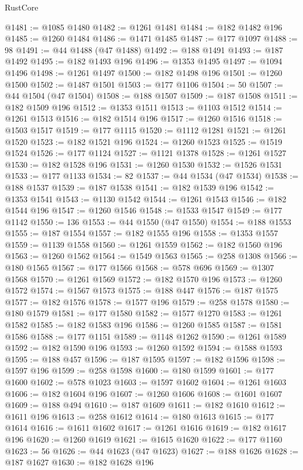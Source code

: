 \begin{lexlean}{RustCore}
\begin{coremodule}
@1481 := @1085 @1480
@1482 := @1261 @1481
@1484 := @182 @1482 @196
@1485 := @1260 @1484
@1486 := @1471 @1485
@1487 := @177 @1097
@1488 := 98
@1491 := @44 @1488 (@47 @1488)
@1492 := @188 @1491
@1493 := @187 @1492
@1495 := @182 @1493 @196
@1496 := @1353 @1495
@1497 := @1094 @1496
@1498 := @1261 @1497
@1500 := @182 @1498 @196
@1501 := @1260 @1500
@1502 := @1487 @1501
@1503 := @177 @1106
@1504 := 50
@1507 := @44 @1504 (@47 @1504)
@1508 := @188 @1507
@1509 := @187 @1508
@1511 := @182 @1509 @196
@1512 := @1353 @1511
@1513 := @1103 @1512
@1514 := @1261 @1513
@1516 := @182 @1514 @196
@1517 := @1260 @1516
@1518 := @1503 @1517
@1519 := @177 @1115
@1520 := @1112 @1281
@1521 := @1261 @1520
@1523 := @182 @1521 @196
@1524 := @1260 @1523
@1525 := @1519 @1524
@1526 := @177 @1124
@1527 := @1121 @1378
@1528 := @1261 @1527
@1530 := @182 @1528 @196
@1531 := @1260 @1530
@1532 := @1526 @1531
@1533 := @177 @1133
@1534 := 82
@1537 := @44 @1534 (@47 @1534)
@1538 := @188 @1537
@1539 := @187 @1538
@1541 := @182 @1539 @196
@1542 := @1353 @1541
@1543 := @1130 @1542
@1544 := @1261 @1543
@1546 := @182 @1544 @196
@1547 := @1260 @1546
@1548 := @1533 @1547
@1549 := @177 @1142
@1550 := 136
@1553 := @44 @1550 (@47 @1550)
@1554 := @188 @1553
@1555 := @187 @1554
@1557 := @182 @1555 @196
@1558 := @1353 @1557
@1559 := @1139 @1558
@1560 := @1261 @1559
@1562 := @182 @1560 @196
@1563 := @1260 @1562
@1564 := @1549 @1563
@1565 := @258 @1308
@1566 := @180 @1565
@1567 := @177 @1566
@1568 := @578 @696
@1569 := @1307 @1568
@1570 := @1261 @1569
@1572 := @182 @1570 @196
@1573 := @1260 @1572
@1574 := @1567 @1573
@1575 := @188 @447
@1576 := @187 @1575
@1577 := @182 @1576
@1578 := @1577 @196
@1579 := @258 @1578
@1580 := @180 @1579
@1581 := @177 @1580
@1582 := @1577 @1270
@1583 := @1261 @1582
@1585 := @182 @1583 @196
@1586 := @1260 @1585
@1587 := @1581 @1586
@1588 := @177 @1151
@1589 := @1148 @1262
@1590 := @1261 @1589
@1592 := @182 @1590 @196
@1593 := @1260 @1592
@1594 := @1588 @1593
@1595 := @188 @457
@1596 := @187 @1595
@1597 := @182 @1596
@1598 := @1597 @196
@1599 := @258 @1598
@1600 := @180 @1599
@1601 := @177 @1600
@1602 := @578 @1023
@1603 := @1597 @1602
@1604 := @1261 @1603
@1606 := @182 @1604 @196
@1607 := @1260 @1606
@1608 := @1601 @1607
@1609 := @188 @494
@1610 := @187 @1609
@1611 := @182 @1610
@1612 := @1611 @196
@1613 := @258 @1612
@1614 := @180 @1613
@1615 := @177 @1614
@1616 := @1611 @1602
@1617 := @1261 @1616
@1619 := @182 @1617 @196
@1620 := @1260 @1619
@1621 := @1615 @1620
@1622 := @177 @1160
@1623 := 56
@1626 := @44 @1623 (@47 @1623)
@1627 := @188 @1626
@1628 := @187 @1627
@1630 := @182 @1628 @196

\end{coremodule}
\end{lexlean}
